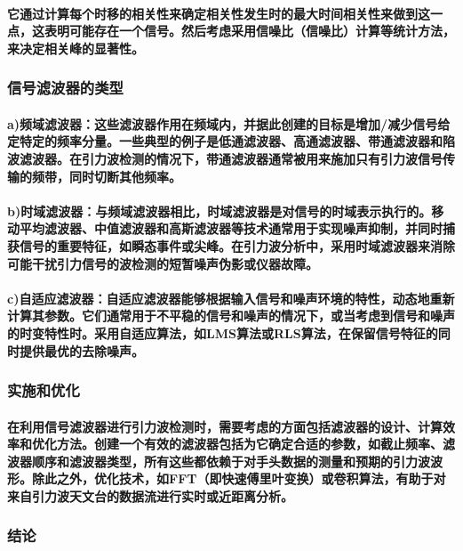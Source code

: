 \documentclass{article}
\begin{document}
\paragraph{它通过计算每个时移的相关性来确定相关性发生时的最大时间相关性来做到这一点，这表明可能存在一个信号。然后考虑采用信噪比（信噪比）计算等统计方法，来决定相关峰的显著性。}
\subsubsection{信号滤波器的类型}
\paragraph{a)频域滤波器：这些滤波器作用在频域内，并据此创建的目标是增加/减少信号给定特定的频率分量。一些典型的例子是低通滤波器、高通滤波器、带通滤波器和陷波滤波器。在引力波检测的情况下，带通滤波器通常被用来施加只有引力波信号传输的频带，同时切断其他频率。}
\paragraph{b)时域滤波器：与频域滤波器相比，时域滤波器是对信号的时域表示执行的。移动平均滤波器、中值滤波器和高斯滤波器等技术通常用于实现噪声抑制，并同时捕获信号的重要特征，如瞬态事件或尖峰。在引力波分析中，采用时域滤波器来消除可能干扰引力信号的波检测的短暂噪声伪影或仪器故障。}
\paragraph{c)自适应滤波器：自适应滤波器能够根据输入信号和噪声环境的特性，动态地重新计算其参数。它们通常用于不平稳的信号和噪声的情况下，或当考虑到信号和噪声的时变特性时。采用自适应算法，如LMS算法或RLS算法，在保留信号特征的同时提供最优的去除噪声。}
\subsubsection{实施和优化}
\paragraph{在利用信号滤波器进行引力波检测时，需要考虑的方面包括滤波器的设计、计算效率和优化方法。创建一个有效的滤波器包括为它确定合适的参数，如截止频率、滤波器顺序和滤波器类型，所有这些都依赖于对手头数据的测量和预期的引力波波形。除此之外，优化技术，如FFT（即快速傅里叶变换）或卷积算法，有助于对来自引力波天文台的数据流进行实时或近距离分析。}
\subsubsection{结论}
\end{document}
